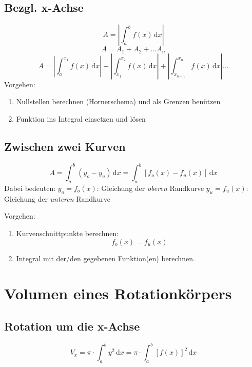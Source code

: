 \subsection{Bezgl. x-Achse} %
\label{sub:bezgl_x_achse}
\[ A = \left| \int_a^b f(x)\,\mathrm{d}x \right|\]
\[ A = A_1 + A_2 + ... A_n\]
\[ A = \left| \int_a^{x_1} f(x)\,\mathrm{d}x \right| + \left| \int_{x_1}^{x_2} f(x)\,\mathrm{d}x \right| + \left| \int_{x_{n-1}}^{x_n} f(x)\,\mathrm{d}x \right| ... \]
\newline Vorgehen:\newline
\begin{enumerate}
	\item Nullstellen berechnen (Hornerschema) und als Grenzen benützen
	\item Funktion ins Integral einsetzen und lösen
\end{enumerate}

\subsection{Zwischen zwei Kurven} %
\label{sub:zwischen_zwei_kurven}
\[ A = \int_a^b (y_o - y_u)\,\mathrm{d}x = \int_a^b [f_o(x) - f_u(x)]\,\mathrm{d}x\]
Dabei bedeuten:\newline
\( y_o = f_o(x)\): Gleichung der \emph{oberen} Randkurve\newline
\( y_u = f_u(x)\): Gleichung der \emph{unteren} Randkurve

Vorgehen:\newline
\begin{enumerate}
	\item Kurvenschnittpunkte berechnen:
	\[f_o(x) = f_u(x)\]
	\item Integral mit der/den gegebenen Funktion(en) berechnen.
\end{enumerate}


\section{Volumen eines Rotationkörpers} %
\label{sec:volumen_eines_rotationkörpers}
\subsection{Rotation um die x-Achse} %
\label{sub:rotation_um_die_x_achse}
\[ V_x = \pi \cdot \int_a^b y^2\,\mathrm{d}x = \pi \cdot \int_a^b [f(x)]^2\,\mathrm{d}x \]
